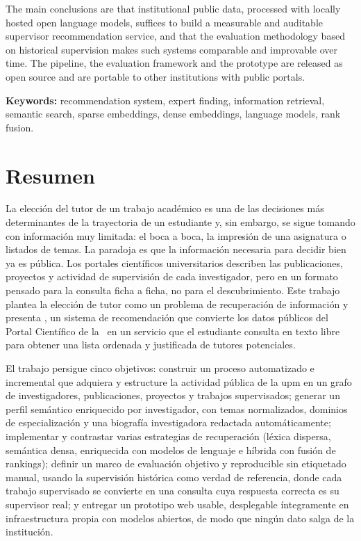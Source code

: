 The main conclusions are that institutional public data, processed with locally hosted open language models, suffices to build a measurable and auditable supervisor recommendation service, and that the evaluation methodology based on historical supervision makes such systems comparable and improvable over time.
The pipeline, the evaluation framework and the prototype are released as open source and are portable to other institutions with public portals.

\textbf{Keywords:} recommendation system, expert finding, information retrieval, semantic search, sparse embeddings, dense embeddings, language models, rank fusion.

\newpage
\section*{Resumen}
\label{sec:resumen}

La elección del tutor de un trabajo académico es una de las decisiones más determinantes de la trayectoria de un estudiante y, sin embargo, se sigue tomando con información muy limitada: el boca a boca, la impresión de una asignatura o listados de temas.
La paradoja es que la información necesaria para decidir bien ya es pública.
Los portales científicos universitarios describen las publicaciones, proyectos y actividad de supervisión de cada investigador, pero en un formato pensado para la consulta ficha a ficha, no para el descubrimiento.
Este trabajo plantea la elección de tutor como un problema de recuperación de información y presenta \proyecto, un sistema de recomendación que convierte los datos públicos del Portal Científico de la \University~en un servicio que el estudiante consulta en texto libre para obtener una lista ordenada y justificada de tutores potenciales.

El trabajo persigue cinco objetivos: construir un proceso automatizado e incremental que adquiera y estructure la actividad pública de la \gls{upm} en un grafo de investigadores, publicaciones, proyectos y trabajos supervisados; generar un perfil semántico enriquecido por investigador, con temas normalizados, dominios de especialización y una biografía investigadora redactada automáticamente; implementar y contrastar varias estrategias de recuperación (léxica dispersa, semántica densa, enriquecida con modelos de lenguaje e híbrida con fusión de rankings); definir un marco de evaluación objetivo y reproducible sin etiquetado manual, usando la supervisión histórica como verdad de referencia, donde cada trabajo supervisado se convierte en una consulta cuya respuesta correcta es su supervisor real; y entregar un prototipo web usable, desplegable íntegramente en infraestructura propia con modelos abiertos, de modo que ningún dato salga de la institución.

